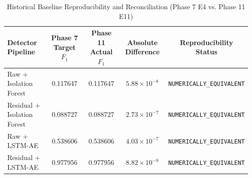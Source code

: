 \begin{table}[htbp]
\centering
\caption{Historical Baseline Reproducibility and Reconciliation (Phase 7 E4 vs. Phase 11 E11)}
\label{tab:baseline_reconciliation}
\begin{tabular}{lcccc}
\hline
\textbf{Detector Pipeline} & \textbf{Phase 7 Target $F_1$} & \textbf{Phase 11 Actual $F_1$} & \textbf{Absolute Difference} & \textbf{Reproducibility Status} \\
\hline
Raw + Isolation Forest & 0.117647 & 0.117647 & $5.88 \times 10^{-8}$ & \texttt{NUMERICALLY_EQUIVALENT} \\
Residual + Isolation Forest & 0.088727 & 0.088727 & $2.73 \times 10^{-7}$ & \texttt{NUMERICALLY_EQUIVALENT} \\
Raw + LSTM-AE & 0.538606 & 0.538606 & $4.03 \times 10^{-7}$ & \texttt{NUMERICALLY_EQUIVALENT} \\
Residual + LSTM-AE & 0.977956 & 0.977956 & $8.82 \times 10^{-8}$ & \texttt{NUMERICALLY_EQUIVALENT} \\
\hline
\end{tabular}
\end{table}
